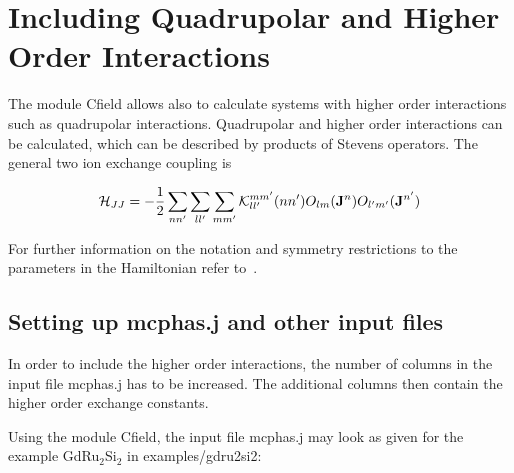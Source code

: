 \section{Including Quadrupolar and Higher Order Interactions}
\label{qint}


The module {\prg Cfield} allows also to calculate systems with higher order interactions such
as quadrupolar interactions. Quadrupolar and higher order interactions can be calculated, which
can be described by products of Stevens operators. The general two ion exchange coupling is

\begin{equation}
\label{multipolehamiltonrepeated}
 {\mathcal H}_{JJ}=
             -\frac{1}{2}  \sum_{nn'} \sum_ {ll'} \sum_{mm'}
     {\mathcal K}_{ll'}^{mm'}(nn') O_{lm}({\mathbf J}^n) O_{l'm'}({\mathbf J}^{n'})
\end{equation}

For further information on the notation and symmetry restrictions to the
parameters in the Hamiltonian refer to~\cite{jensen91-1}.


\subsection{Setting up {\prg mcphas.j} and other input files}

In order to include the higher order interactions, the number of columns in the input file
{\prg mcphas.j} has to be increased. The additional columns then contain the higher order
exchange constants.

Using the module {\prg Cfield}, the input file {\prg mcphas.j} may look as given for the 
example GdRu$_2$Si$_2$ in {\prg examples/gdru2si2}:

